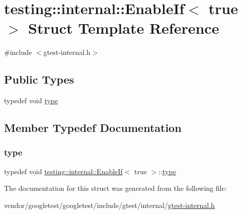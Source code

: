 \hypertarget{structtesting_1_1internal_1_1_enable_if_3_01true_01_4}{}\section{testing\+:\+:internal\+:\+:Enable\+If$<$ true $>$ Struct Template Reference}
\label{structtesting_1_1internal_1_1_enable_if_3_01true_01_4}


{\ttfamily \#include $<$gtest-\/internal.\+h$>$}

\subsection*{Public Types}
\begin{DoxyCompactItemize}
\item 
typedef void \hyperlink{structtesting_1_1internal_1_1_enable_if_3_01true_01_4_a9398d803f1fdd99ff41823746f6299ff}{type}
\end{DoxyCompactItemize}


\subsection{Member Typedef Documentation}
\mbox{\label{structtesting_1_1internal_1_1_enable_if_3_01true_01_4_a9398d803f1fdd99ff41823746f6299ff}} 
\subsubsection{\texorpdfstring{type}{type}}
{\footnotesize\ttfamily typedef void \hyperlink{structtesting_1_1internal_1_1_enable_if}{testing\+::internal\+::\+Enable\+If}$<$ true $>$\+::\hyperlink{structtesting_1_1internal_1_1_enable_if_3_01true_01_4_a9398d803f1fdd99ff41823746f6299ff}{type}}



The documentation for this struct was generated from the following file\+:\begin{DoxyCompactItemize}
\item 
vendor/googletest/googletest/include/gtest/internal/\hyperlink{gtest-internal_8h}{gtest-\/internal.\+h}\end{DoxyCompactItemize}
